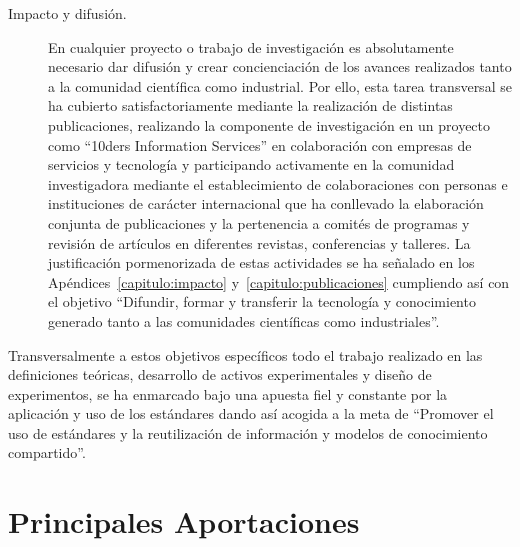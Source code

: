 \begin{description}
\item [Impacto y difusión.] En cualquier proyecto o trabajo de investigación es absolutamente necesario 
dar difusión y crear concienciación de los avances realizados tanto a la comunidad científica como 
industrial. Por ello, esta tarea transversal se ha cubierto satisfactoriamente mediante la realización 
de distintas publicaciones, realizando la componente de investigación en un proyecto como 
``10ders Information Services'' en colaboración con empresas de servicios y tecnología y participando 
activamente en la comunidad investigadora mediante el establecimiento de colaboraciones con personas e 
instituciones de carácter internacional que ha conllevado la elaboración conjunta de publicaciones y 
la pertenencia a comités de programas y revisión de artículos en diferentes revistas, conferencias 
y talleres. La justificación pormenorizada de estas actividades se ha señalado en los Apéndices~\ref{capitulo:impacto} y~\ref{capitulo:publicaciones} 
cumpliendo así con el objetivo ``Difundir, formar y transferir la tecnología y 
conocimiento generado tanto a las comunidades científicas como industriales''.
 
\end{description}

Transversalmente a estos objetivos específicos todo el trabajo realizado en las definiciones teóricas, desarrollo de activos experimentales 
y diseño de experimentos, se ha enmarcado bajo una apuesta fiel y constante por la aplicación y uso de los estándares 
dando así acogida a la meta de ``Promover el uso de estándares y la reutilización de 
información y modelos de conocimiento compartido''.

\section{Principales Aportaciones}
